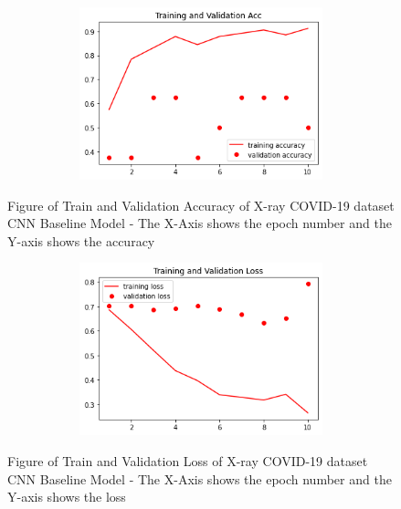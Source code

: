 \begin{table}[H]
    \centering
    \caption{X-ray COVID-19 dataset CNN baseline model results}
    \label{tab:X-ray COVID-19 dataset CNN baseline model results}
\end{table}
 \begin{figure}[H]
    \centering
    \includegraphics[width=1\textwidth,height=5cm,keepaspectratio]{Images/X-ray COVID-19 dataset CNN Train and Val Acc.png}\\
    \caption{Figure of Train and Validation Accuracy of X-ray COVID-19 dataset CNN Baseline Model  - The X-Axis shows the epoch number and the Y-axis shows the accuracy}
    \label{fig:X-ray COVID-19 dataset CNN Baseline Train and Validation Accuracy}
\end{figure}
 \begin{figure}[H]
    \centering
    \includegraphics[width=1\textwidth,height=5cm,keepaspectratio]{Images/X-ray COVID-19 dataset CNN Train and Val Loss.png}\\
    \caption{Figure of Train and Validation Loss of X-ray COVID-19 dataset CNN Baseline Model  - The X-Axis shows the epoch number and the Y-axis shows the loss}
    \label{fig:X-ray COVID-19 dataset CNN Baseline Train and Validation Loss}
\end{figure}
